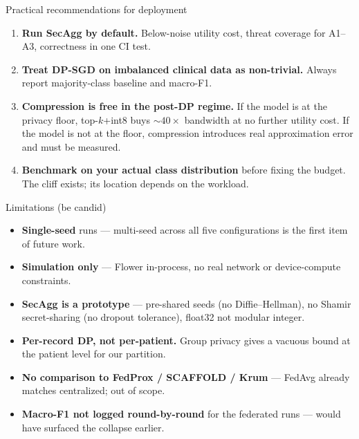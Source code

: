\documentclass[10pt,aspectratio=169]{beamer}
\begin{document}
\begin{frame}{Practical recommendations for deployment}
  \begin{enumerate}
    \item \textbf{Run SecAgg by default.} Below-noise utility cost, threat coverage for A1--A3, correctness in one CI test.
    \vspace{0.3em}
    \item \textbf{Treat DP-SGD on imbalanced clinical data as non-trivial.} Always report majority-class baseline and macro-F1.
    \vspace{0.3em}
    \item \textbf{Compression is free in the post-DP regime.} If the model is at the privacy floor, top-$k$+int8 buys $\sim$$40\times$ bandwidth at no further utility cost. If the model is not at the floor, compression introduces real approximation error and must be measured.
    \vspace{0.3em}
    \item \textbf{Benchmark on your actual class distribution} before fixing the budget. The cliff exists; its location depends on the workload.
  \end{enumerate}
\end{frame}

\begin{frame}{Limitations (be candid)}
  \begin{itemize}
    \item \textbf{Single-seed} runs --- multi-seed across all five configurations is the first item of future work.
    \item \textbf{Simulation only} --- Flower in-process, no real network or device-compute constraints.
    \item \textbf{SecAgg is a prototype} --- pre-shared seeds (no Diffie--Hellman), no Shamir secret-sharing (no dropout tolerance), float32 not modular integer.
    \item \textbf{Per-record DP, not per-patient.} Group privacy gives a vacuous bound at the patient level for our partition.
    \item \textbf{No comparison to FedProx / SCAFFOLD / Krum} --- FedAvg already matches centralized; out of scope.
    \item \textbf{Macro-F1 not logged round-by-round} for the federated runs --- would have surfaced the collapse earlier.
  \end{itemize}
\end{frame}
\end{document}
